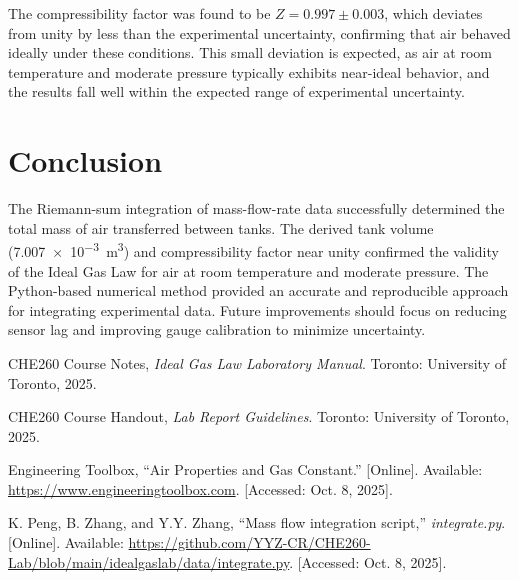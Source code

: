 \documentclass[12pt]{article}
\begin{document}
The compressibility factor was found to be \(Z = 0.997 \pm 0.003\), 
which deviates from unity by less than the experimental uncertainty, 
confirming that air behaved ideally under these conditions. 
This small deviation is expected, as air at room temperature and moderate pressure 
typically exhibits near-ideal behavior, 
and the results fall well within the expected range of experimental uncertainty.

\section*{Conclusion}
The Riemann-sum integration of mass-flow-rate data successfully determined the total mass of air transferred between tanks. The derived tank volume (\SI{7.007e-3}{\metre\cubed}) and compressibility factor near unity confirmed the validity of the Ideal Gas Law for air at room temperature and moderate pressure. The Python-based numerical method provided an accurate and reproducible approach for integrating experimental data. Future improvements should focus on reducing sensor lag and improving gauge calibration to minimize uncertainty.

\newpage
\begin{thebibliography}{9}
CHE260 Course Notes, \textit{Ideal Gas Law Laboratory Manual}. Toronto: University of Toronto, 2025.

CHE260 Course Handout, \textit{Lab Report Guidelines}. Toronto: University of Toronto, 2025.

Engineering Toolbox, ``Air Properties and Gas Constant.'' [Online]. Available: \url{https://www.engineeringtoolbox.com}. [Accessed: Oct. 8, 2025].

K. Peng, B. Zhang, and Y.Y. Zhang, ``Mass flow integration script,'' \textit{integrate.py}. [Online]. Available: \url{https://github.com/YYZ-CR/CHE260-Lab/blob/main/idealgaslab/data/integrate.py}. [Accessed: Oct. 8, 2025].
\end{thebibliography}
\end{document}
